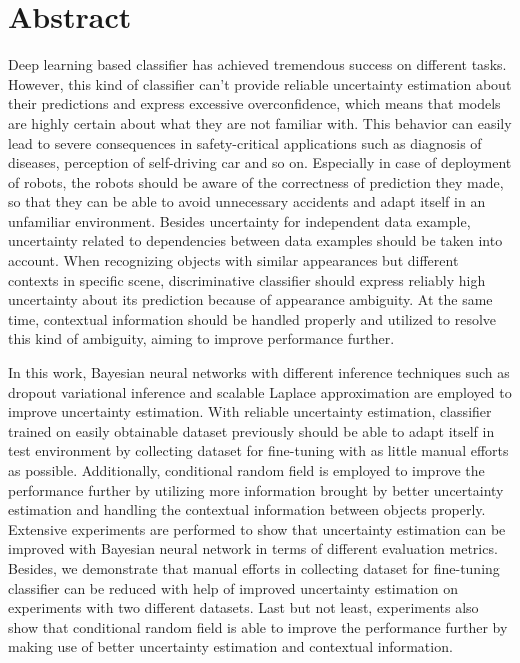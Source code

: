 
\thispagestyle{plain}

\section*{Abstract}
Deep learning based classifier has achieved tremendous success on different tasks. However, this kind of classifier can't provide reliable uncertainty estimation about their predictions and express excessive overconfidence, which means that models are highly certain about what they are not familiar with. This behavior can easily lead to severe consequences in safety-critical applications such as diagnosis of diseases, perception of self-driving car and so on. Especially in case of deployment of robots, the robots should be aware of the correctness of prediction they made, so that they can be able to avoid unnecessary accidents and adapt itself in an unfamiliar environment. Besides uncertainty for independent data example, uncertainty related to dependencies between data examples should be taken into account. When recognizing objects with similar appearances but different contexts in specific scene, discriminative classifier should express reliably high uncertainty about its prediction because of appearance ambiguity. At the same time, contextual information should be handled properly and utilized to resolve this kind of ambiguity, aiming to improve performance further. 

In this work, Bayesian neural networks with different inference techniques such as dropout variational inference and scalable Laplace approximation are employed to improve uncertainty estimation. With reliable uncertainty estimation, classifier trained on easily obtainable dataset previously should be able to adapt itself in test environment by collecting dataset for fine-tuning with as little manual efforts as possible. Additionally, conditional random field is employed to improve the performance further by utilizing more information brought by better uncertainty estimation and handling the contextual information between objects properly. Extensive experiments are performed to show that uncertainty estimation can be improved with Bayesian neural network in terms of different evaluation metrics. Besides, we demonstrate that manual efforts in collecting dataset for fine-tuning classifier can be reduced with help of improved uncertainty estimation on experiments with two different datasets. Last but not least, experiments also show that conditional random field is able to improve the performance further by making use of better uncertainty estimation and contextual information.

\switchlanguage{\lang} %
